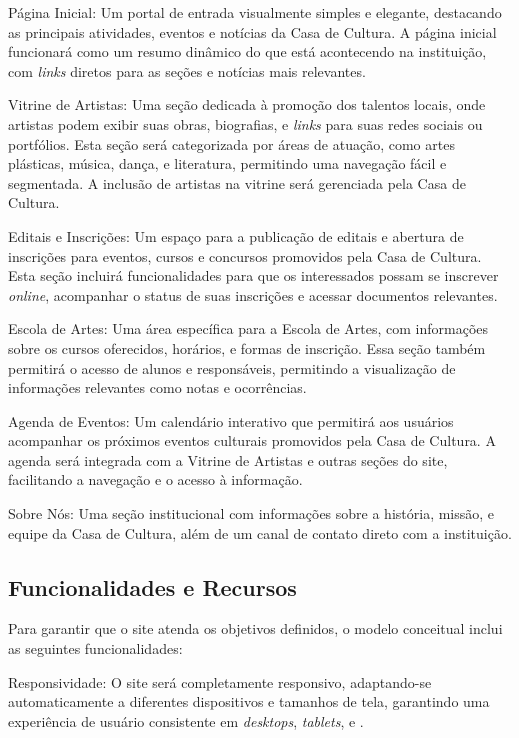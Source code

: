 Página Inicial: Um portal de entrada visualmente simples e elegante, destacando as principais atividades, eventos e notícias da Casa de Cultura. A página inicial funcionará como um resumo dinâmico do que está acontecendo na instituição, com \textit{links} diretos para as seções e notícias mais relevantes.

Vitrine de Artistas: Uma seção dedicada à promoção dos talentos locais, onde artistas podem exibir suas obras, biografias, e \textit{links} para suas redes sociais ou portfólios. Esta seção será categorizada por áreas de atuação, como artes plásticas, música, dança, e literatura, permitindo uma navegação fácil e segmentada. A inclusão de artistas na vitrine será gerenciada pela Casa de Cultura.

Editais e Inscrições: Um espaço para a publicação de editais e abertura de inscrições para eventos, cursos e concursos promovidos pela Casa de Cultura. Esta seção incluirá funcionalidades para que os interessados possam se inscrever \textit{online}, acompanhar o status de suas inscrições e acessar documentos relevantes.

Escola de Artes: Uma área específica para a Escola de Artes, com informações sobre os cursos oferecidos, horários, e formas de inscrição. Essa seção também permitirá o acesso de alunos e responsáveis, permitindo a visualização de informações relevantes como notas e ocorrências.

Agenda de Eventos: Um calendário interativo que permitirá aos usuários acompanhar os próximos eventos culturais promovidos pela Casa de Cultura. A agenda será integrada com a Vitrine de Artistas e outras seções do site, facilitando a navegação e o acesso à informação.

Sobre Nós: Uma seção institucional com informações sobre a história, missão, e equipe da Casa de Cultura, além de um canal de contato direto com a instituição.

\subsection{Funcionalidades e Recursos}

Para garantir que o site atenda os objetivos definidos, o modelo conceitual inclui as seguintes funcionalidades:

Responsividade: O site será completamente responsivo, adaptando-se automaticamente a diferentes dispositivos e tamanhos de tela, garantindo uma experiência de usuário consistente em \textit{desktops}, \textit{tablets}, e .

